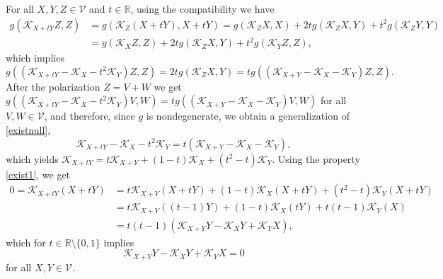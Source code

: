 \documentclass[preprint]{elsarticle}
\newcommand\mc{\mathcal}
\newcommand\mb{\mathbb}
\begin{document}
For all $X,Y,Z\in\mc{V}$ and $t\in\mb{R}$, using the compatibility we have
\begin{equation*}
\begin{aligned}
g(\mc{K}_{X+tY}Z,Z)&=g(\mc{K}_Z(X+tY),X+tY)=g(\mc{K}_ZX,X)+2tg(\mc{K}_ZX,Y)+t^2g(\mc{K}_ZY,Y)\\
&=g(\mc{K}_XZ,Z)+2tg(\mc{K}_ZX,Y)+t^2g(\mc{K}_YZ,Z),
\end{aligned}
\end{equation*}
which implies
\begin{equation*}
g((\mc{K}_{X+tY}-\mc{K}_X-t^2\mc{K}_Y )Z,Z)=2tg(\mc{K}_ZX,Y)=tg((\mc{K}_{X+Y}-\mc{K}_X-\mc{K}_Y )Z,Z).
\end{equation*}
After the polarization $Z=V+W$ we get
$g((\mc{K}_{X+tY}-\mc{K}_X-t^2\mc{K}_Y )V,W)=tg((\mc{K}_{X+Y}-\mc{K}_X-\mc{K}_Y )V,W)$ for all $V,W\in\mc{V}$,
and therefore, since $g$ is nondegenerate, we obtain a generalization of \eqref{existnull},
\begin{equation}\label{exist3}
\mc{K}_{X+tY}-\mc{K}_X-t^2\mc{K}_Y =t( \mc{K}_{X+Y}-\mc{K}_X-\mc{K}_Y ),
\end{equation}
which yields
$\mc{K}_{X+tY}= t\mc{K}_{X+Y} +(1-t)\mc{K}_X +(t^2-t)\mc{K}_Y$.
Using the property \eqref{exist1}, we get
\begin{equation*}
\begin{aligned}
0=\mc{K}_{X+tY}(X+tY)&= t\mc{K}_{X+Y}(X+tY) +(1-t)\mc{K}_X(X+tY) +(t^2-t)\mc{K}_Y(X+tY)\\
&= t\mc{K}_{X+Y}((t-1)Y) +(1-t)\mc{K}_X(tY) + t(t-1)\mc{K}_Y(X)\\
&= t(t-1)(\mc{K}_{X+Y}Y -\mc{K}_XY +\mc{K}_YX),
\end{aligned}
\end{equation*}
which for $t\in\mb{R}\setminus\{0,1\}$ implies
\begin{equation}\label{exist4}
\mc{K}_{X+Y}Y -\mc{K}_XY +\mc{K}_YX=0
\end{equation}
for all $X,Y\in\mc{V}$.
\end{document}

